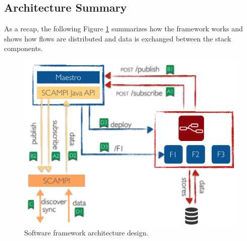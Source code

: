 \subsection{Architecture Summary}

As a recap, the following Figure \ref{fig:design} summarizes how the framework works and shows how flows are distributed and data is exchanged between the stack components. 
\begin{figure}[H]
	\centering
	\includegraphics[scale=0.5]{images/design.png}
	\caption{Software framework architecture design. }
	\label{fig:design}
\end{figure}


